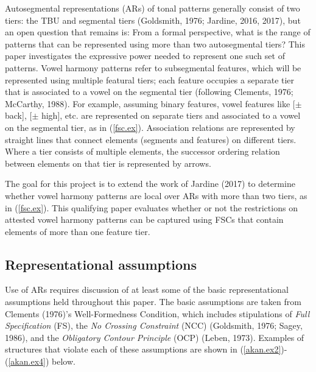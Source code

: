 \documentclass[,doc,floatsintext]{apa6}
\theoremstyle{definition}
\theoremstyle{definition}
\theoremstyle{definition}
\theoremstyle{remark}
\begin{document}
Autosegmental representations (ARs) of tonal patterns generally consist
of two tiers: the TBU and segmental tiers (Goldsmith, 1976; Jardine,
2016, 2017), but an open question that remains is: From a formal
perspective, what is the range of patterns that can be represented using
more than two autosegmental tiers? This paper investigates the
expressive power needed to represent one such set of patterns. Vowel
harmony patterns refer to subsegmental features, which will be
represented using multiple featural tiers; each feature occupies a
separate tier that is associated to a vowel on the segmental tier
(following Clements, 1976; McCarthy, 1988). For example, assuming binary
features, vowel features like {[}\(\pm\) back{]}, {[}\(\pm\) high{]},
etc. are represented on separate tiers and associated to a vowel on the
segmental tier, as in (\ref{fsc.ex}). Association relations are
represented by straight lines that connect elements (segments and
features) on different tiers. Where a tier consists of multiple
elements, the successor ordering relation between elements on that tier
is represented by arrows.

\begin{exe}
\ex \label{fsc.ex}
\end{exe}

The goal for this project is to extend the work of Jardine (2017) to
determine whether vowel harmony patterns are local over ARs with more
than two tiers, as in (\ref{fsc.ex}). This qualifying paper evaluates
whether or not the restrictions on attested vowel harmony patterns can
be captured using FSCs that contain elements of more than one feature
tier.

\subsection{Representational
assumptions}\label{representational-assumptions}

Use of ARs requires discussion of at least some of the basic
representational assumptions held throughout this paper. The basic
assumptions are taken from Clements (1976)'s Well-Formedness Condition,
which includes stipulations of \emph{Full Specification} (FS), the
\emph{No Crossing Constraint} (NCC) (Goldsmith, 1976; Sagey, 1986), and
the \emph{Obligatory Contour Principle} (OCP) (Leben, 1973). Examples of
structures that violate each of these assumptions are shown in
(\ref{akan.ex2})-(\ref{akan.ex4}) below.
\end{document}
